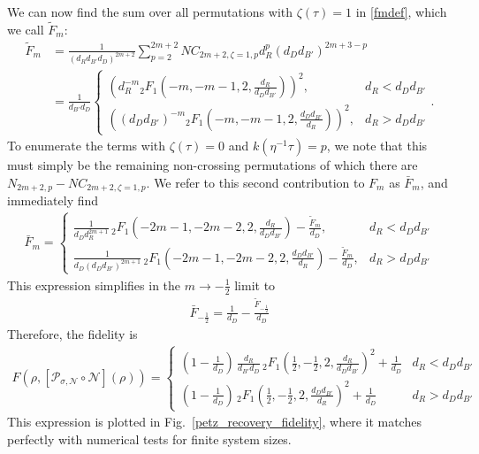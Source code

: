 \documentclass[a4paper,11pt]{article}
\newcommand\half{{\ensuremath{\frac{1}{2}}}}
\newcommand\ha{{\half}}
\begin{document}
\begin{enumerate}
We can now find the sum over all permutations with $\zeta(\tau) = 1$ in \eqref{fmdef}, which we call $\tilde{F}_m$: 
\begin{align}
	\tilde{F}_m 
 &= \frac{1}{(d_R d_{B'} d_D)^{2m +2}}\sum_{p = 2}^{2m+2}NC_{2m+2, \zeta = 1,p} d_R^{p} (d_Dd_{B'})^{2m+3-p}
 \nonumber
 \\
 &= \frac{1}{d_{B'} d_D}\begin{cases}
 \left(d_R^{-m} {}_2F_1\left(-m,-m-1,2,\frac{d_R}{d_D d_{B'}}\right) \right)^2, & d_R < d_D d_{B'}
\\
 \left( (d_D d_{B'})^{-m} {}_2F_1\left(-m,-m-1,2,\frac{d_D d_{B'}}{d_R}\right) \right)^2, & d_R > d_D d_{B'}
 \end{cases}.
 \end{align}
To enumerate the terms with $\zeta(\tau)=0$ and $k(\eta^{-1}\tau) =p$, we note that this must simply be the remaining non-crossing permutations of which there are $N_{2m+2,p}-NC_{2m+2, \zeta = 1,p} $. We refer to this second contribution to $F_m$ as $\bar{F}_m$, and immediately find
\begin{align}
	\bar{F}_m =\begin{cases} \frac{1}{d_D d_R^{2m+1}}\, {}_2 F_1\left(-2m-1,-2m-2,2 ,\frac{d_R}{d_D d_{B'}}\right) - \frac{\tilde{F}_m}{d_D}, & d_R < d_D d_{B'}
\\
\frac{1}{d_D (d_D d_{B'})^{2m+1}}\, {}_2 F_1\left(-2m-1,-2m-2,2 ,\frac{d_D d_{B'}}{d_R}\right) - \frac{\tilde{F}_m}{d_D}, & d_R > d_D d_{B'}
	\end{cases} 
\end{align}
This expression simplifies in the $m\rightarrow -\frac{1}{2} $ limit to 
\begin{align}
	\bar{F}_{-\frac{1}{2}} =\frac{1}{d_D} - \frac{\tilde{F}_{-\frac{1}{2}}}{d_D}
\end{align}
Therefore, the fidelity is
\begin{align}
	F(\rho , [\mathcal{P}_{\sigma,\mathcal{N}}\circ \mathcal{N}](\rho)) %
	= \begin{cases} 
(1- \frac{1}{d_D})\, \frac{d_R}{d_{B'}d_D} \, {}_2F_1\left(\ha,-\ha,2,\frac{d_R}{d_D d_{B'}}\right)^2 + \frac{1}{d_D}	& d_R < d_D d_{B'} \\
	 (1- \frac{1}{d_D}) \, {}_2F_1\left(\ha,-\ha,2,\frac{d_D d_{B'}}{d_R}\right)^2 + \frac{1}{d_D} & d_R > d_D d_{B'} 
	\end{cases} 
	\label{fidelity_inf}
\end{align}
This expression is plotted in Fig.~\ref{petz_recovery_fidelity}, where it matches perfectly with numerical tests for finite system sizes.


\end{enumerate}
\end{document}
